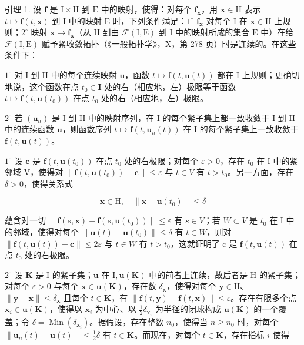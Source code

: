 引理 1. 设 \(\mathbf{f}\) 是 \(\mathrm{I} \times \mathrm{H}\) 到 \(\mathrm{E}\) 中的映射，使得：对每个 \(\mathbf{f}_{\mathbf{x}}\)，用 \(\mathbf{x} \in \mathrm{H}\) 表示 \(t \mapsto \mathbf{f}(t, \mathbf{x})\) 到 \(\mathrm{I}\) 中的映射 \(\mathrm{E}\) 时，下列条件满足：\(1^{\circ}\) \(\mathbf{f}_{\mathbf{x}}\) 对每个 \(\mathrm{I}\) 在 \(\mathbf{x} \in \mathrm{H}\) 上规则；\(2^{\circ}\) 映射 \(\mathbf{x} \mapsto \mathbf{f}_{\mathbf{x}}\)（从 \(\mathrm{H}\) 到由 \(\mathcal{F}(\mathrm{I}, \mathrm{E})\) 到 \(\mathrm{I}\) 中的映射所成的集合 \(\mathrm{E}\) 中）在给 \(\mathcal{F}(\mathrm{I}, \mathrm{E})\) 赋予紧收敛拓扑（《一般拓扑学》，X，第 278 页）时是连续的。在这些条件下：

\(1^{\circ}\) 对 I 到 H 中的每个连续映射 \(\mathbf{u}\)，函数 \(t \mapsto \mathbf{f}(t, \mathbf{u}(t))\) 都在 I 上规则；更确切地说，这个函数在点 \(t_0 \in \mathbf{I}\) 处的右（相应地，左）极限等于函数 \(t \mapsto \mathbf{f}(t, \mathbf{u}(t_0))\) 在点 \(t_0\) 处的右（相应地，左）极限。

\(2^{\circ}\) 若 \((\mathbf{u}_n)\) 是 I 到 H 中的映射序列，在 I 的每个紧子集上都一致收敛于 I 到 H 中的连续函数 \(\mathbf{u}\)，则函数序列 \(t \mapsto \mathbf{f}(t, \mathbf{u}_n(t))\) 在 I 的每个紧子集上一致收敛于 \(\mathbf{f}(t, \mathbf{u}(t))\)。

\(1^{\circ}\) 设 \(\mathbf{c}\) 是 \(\mathbf{f}(t, \mathbf{u}(t_0))\) 在点 \(t_0\) 处的右极限；对每个 \(\varepsilon > 0\)，存在 \(t_0\) 在 I 中的紧邻域 V，使得对 \(\| \mathbf{f}(t, \mathbf{u}(t_0)) - \mathbf{c} \| \leqslant \varepsilon\) 与 \(t \in V\) 有 \(t > t_0\)。另一方面，存在 \(\delta > 0\)，使得关系式

\[
\mathbf {x} \in \mathrm{H}, \quad \| \mathbf {x} - \mathbf {u} (t _ {0}) \| \leqslant \delta
\]

蕴含对一切 \(\|\mathbf{f}(s,\mathbf{x})-\mathbf{f}(s,\mathbf{u}(t_{0}))\|\leqslant\varepsilon\) 有 \(s\in V\)；若 \(W\subset V\) 是 \(t_{0}\) 在 I 中的邻域，使得对每个 \(\|\mathbf{u}(t)-\mathbf{u}(t_{0})\|\leqslant\delta\) 有 \(t\in W\)，则对 \(\|\mathbf{f}(t,\mathbf{u}(t))-\mathbf{c}\|\leqslant2\varepsilon\) 与 \(t\in W\) 有 \(t>t_{0}\)，这就证明了 c 是 \(\mathbf{f}(t,\mathbf{u}(t))\) 在点 \(t_{0}\) 处的右极限。

\(2^{\circ}\) 设 \(\mathbf{K}\) 是 \(\mathrm{I}\) 的紧子集；\(\mathbf{u}\) 在 \(\mathrm{I}, \mathbf{u}(\mathbf{K})\) 中的前者上连续，故后者是 \(\mathrm{H}\) 的紧子集；对每个 \(\varepsilon > 0\) 与每个 \(\mathbf{x} \in \mathbf{u}(\mathbf{K})\)，存在数 \(\delta_{\mathbf{x}}\)，使得对每个 \(\mathbf{y} \in \mathrm{H}\)、\(\| \mathbf{y} - \mathbf{x} \| \leqslant \delta_{\mathbf{x}}\) 且每个 \(t \in \mathbf{K}\)，有 \(\| \mathbf{f}(t, \mathbf{y}) - \mathbf{f}(t, \mathbf{x}) \| \leqslant \varepsilon\)。存在有限多个点 \(\mathbf{x}_i \in \mathbf{u}(\mathbf{K})\)，使得以 \(\mathbf{x}_i\) 为中心、以 \(\frac{1}{2} \delta_{\mathbf{x}_i}\) 为半径的闭球构成 \(\mathbf{u}(\mathbf{K})\) 的一个覆盖；令 \(\delta = \operatorname{Min}\left(\delta_{\mathbf{x}_i}\right)\)。据假设，存在整数 \(n_0\)，使得当 \(n \geqslant n_0\) 时，对每个 \(\| \mathbf{u}_n(t) - \mathbf{u}(t) \| \leqslant \frac{1}{2} \delta\) 有 \(t \in \mathbf{K}\)。而现在，对每个 \(t \in \mathbf{K}\)，存在指标 \(i\) 使得

